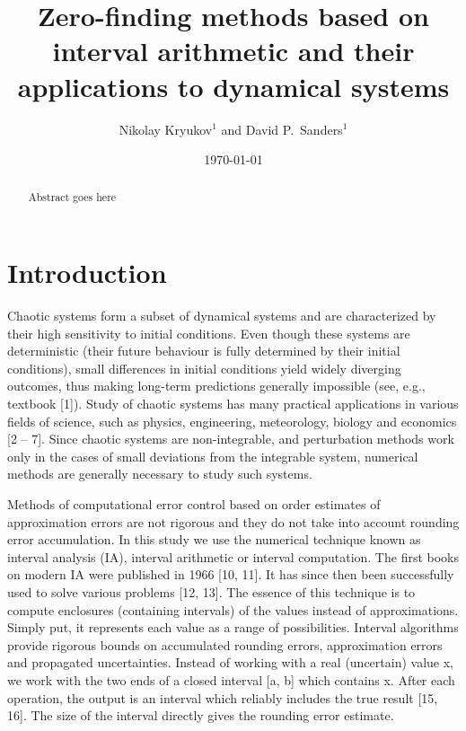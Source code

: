 \documentclass[pre,amsmath,amssymb, twocolumn, showpacs]{revtex4-1}
\begin{document}
\title{Zero-finding methods based on interval arithmetic and their applications to dynamical systems}

\author{Nikolay Kryukov$^{1}$ and David P.~Sanders$^{1}$}

\address{$^{1}$Departamento de F\'isica, Facultad de Ciencias, Universidad Nacional
Aut\'onoma de M\'exico,
Ciudad Universitaria, M\'exico D.F.\ 04510, Mexico
}

 \date{\today}


\begin{abstract}

Abstract goes here

 \end{abstract}

\maketitle

\section{Introduction}


Chaotic systems form a subset of dynamical systems and are characterized by their high sensitivity to initial conditions. Even though these systems are deterministic (their future behaviour is fully determined by their initial conditions), small differences in initial conditions yield widely diverging outcomes, thus making long-term predictions generally impossible (see, e.g., textbook [1]). Study of chaotic systems has many practical applications in various fields of science, such as physics, engineering, meteorology, biology and economics [2 – 7]. Since chaotic systems are non-integrable, and perturbation methods work only in the cases of small deviations from the integrable system, numerical methods are generally necessary to study such systems.

Methods of computational error control based on order estimates of approximation errors are not rigorous and they do not take into account rounding error accumulation. In this study we use the numerical technique known as interval analysis (IA), interval arithmetic or interval computation. The first books on modern IA were published in 1966 [10, 11]. It has since then been successfully used to solve various problems [12, 13]. The essence of this technique is to compute enclosures (containing intervals) of the values instead of approximations. Simply put, it represents each value as a range of possibilities. Interval algorithms provide rigorous bounds on accumulated rounding errors, approximation errors and propagated uncertainties. Instead of working with a real (uncertain) value x, we work with the two ends of a closed interval [a, b] which contains x. After each operation, the output is an interval which reliably includes the true result [15, 16]. The size of the interval directly gives the rounding error estimate.
\end{document}
